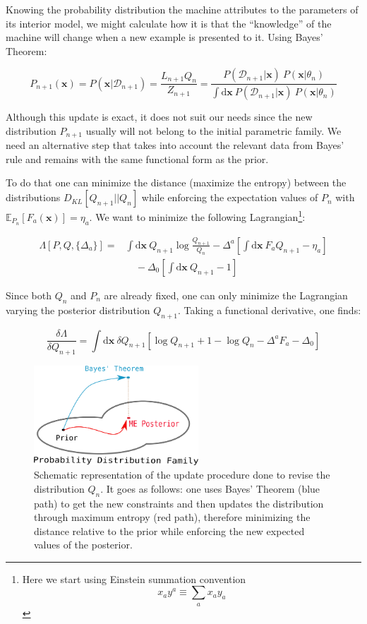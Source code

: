 \documentclass[12pt,a4paperpaper,]{tufte-book}
\begin{document}
Knowing the probability distribution the machine attributes to the parameters of its interior model, we might calculate how it is that the ``knowledge'' of the machine will change when a new example is presented to it. Using Bayes' Theorem:

\[ P_{n+1}(\mathbf{x}) = P(\mathbf{x}| \mathcal{D}_{n+1}) = \frac{L_{n+1} Q_n}{Z_{n+1}} = \frac{P(\mathcal{D}_{n+1}| \mathbf{x})\ P(\mathbf{x}| \theta_n)}{\int \mathrm{d}\mathbf{x}\ P(\mathcal{D}_{n+1}| \mathbf{x})\ P(\mathbf{x}| \theta_n)}\]

Although this update is exact, it does not suit our needs since the new distribution \(P_{n+1}\) usually will not belong to the initial parametric family. We need an alternative step that takes into account the relevant data from Bayes' rule and remains with the same functional form as the prior.

To do that one can minimize the distance (maximize the entropy) between the distributions \(D_{KL}[Q_{n+1}||Q_n]\) while enforcing the expectation values of \(P_n\) with \(\mathbb{E}_{P_n}[F_a(\mathbf{x})] = \eta_a\). We want to minimize the following Lagrangian\footnote{Here we start using Einstein summation convention \[ x_a y^a \equiv \sum_a x_a y_a \]}:

\begin{align}
     \Lambda[P, Q, \{\Delta_a\}] = &\int \mathrm{d}\mathbf{x}\ Q_{n+1} \log\frac{Q_{n+1}}{Q_n} - \Delta^a \left[\int \mathrm{d}\mathbf{x}\ F_a Q_{n+1} - \eta_a \right] \\
    &\quad - \Delta_0 \left[ \int \mathrm{d}\mathbf{x}\ Q_{n+1} - 1 \right]
\end{align}

Since both \(Q_n\) and \(P_n\) are already fixed, one can only minimize the Lagrangian varying the posterior distribution \(Q_{n+1}\). Taking a functional derivative, one finds:

\[ \frac{\delta \Lambda}{\delta Q_{n+1}} = \int \mathrm{d}\mathbf{x}\ \delta Q_{n+1} \left[ \log Q_{n+1} + 1 - \log Q_n - \Delta^a F_a - \Delta_0 \right]\]

\begin{figure}
\hypertarget{fig:updateproject}{%
\centering
\includegraphics[width=0.55\textwidth,height=\textheight]{images/em-updateproject.png}
\caption{Schematic representation of the update procedure done to revise the distribution \(Q_n\). It goes as follows: one uses Bayes' Theorem (blue path) to get the new constraints and then updates the distribution through maximum entropy (red path), therefore minimizing the distance relative to the prior while enforcing the new expected values of the posterior.}\label{fig:updateproject}
}
\end{figure}
\end{document}
